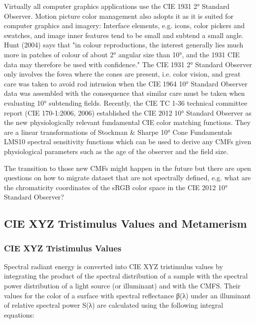 Virtually all computer graphics applications use the CIE 1931 2° Standard Observer. Motion picture color management also adopts it as it is suited for computer graphics and imagery:
Interface elements, e.g. icons, color pickers and swatches, and image inner features tend to be small and subtend a small angle. Hunt (2004) says that "in colour reproductions, the interest generally lies much more in patches of colour of about 2° angular size than 10°, and the 1931 CIE data may therefore be used with confidence."
The CIE 1931 2° Standard Observer only involves the fovea where the cones are present, i.e. color vision, and great care was taken to avoid rod intrusion when the CIE 1964 10° Standard Observer data was assembled with the consequence that similar care must be taken when evaluating 10° subtending fields.
Recently, the CIE TC 1-36 technical committee report (CIE 170-1:2006, 2006) established the CIE 2012 10° Standard Observer as the new physiologically relevant fundamental CIE color matching functions. They are a linear transformations of Stockman & Sharpe 10° Cone Fundamentals LMS10 spectral sensitivity functions which can be used to derive any CMFs given physiological parameters such as the age of the observer and the field size.

The transition to those new CMFs might happen in the future but there are open questions on how to migrate dataset that are not spectrally defined, e.g. what are the chromaticity coordinates of the sRGB color space in the CIE 2012 10° Standard Observer?

\subsection{CIE XYZ Tristimulus Values and Metamerism}%
\label{subsec:cie-xyz-tristimulus-values-and-metamerism}

\subsubsection{CIE XYZ Tristimulus Values}%
\label{subsubsec:cie-xyz-tristimulus-values}

Spectral radiant energy is converted into CIE XYZ tristimulus values by integrating the product of the spectral distribution of a sample with the spectral power distribution of a light source (or illuminant) and with the CMFS. Their values for the color of a surface with spectral reflectance β(λ) under an illuminant of relative spectral power S(λ) are calculated using the following integral equations:


